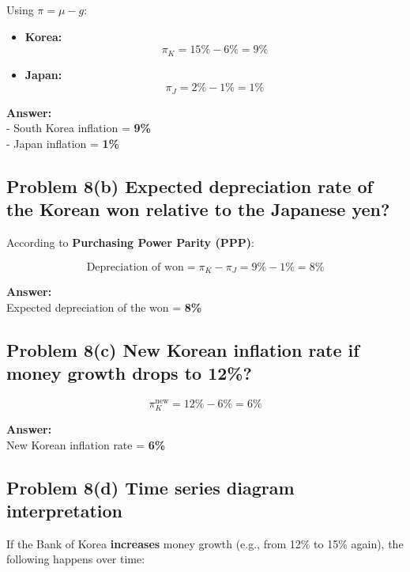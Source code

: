 \documentclass[
]{article}
\begin{document}
Using \(\pi = \mu - g\):

\begin{itemize}
\item
  \textbf{Korea:}\\
  \[
  \pi_K = 15\% - 6\% = 9\%
  \]
\item
  \textbf{Japan:}\\
  \[
  \pi_J = 2\% - 1\% = 1\%
  \]
\end{itemize}

\textbf{Answer:}\\
- South Korea inflation = \textbf{9\%}\\
- Japan inflation = \textbf{1\%}

\subsection{Problem 8(b) Expected depreciation rate of the Korean won
relative to the Japanese
yen?}\label{problem-8b-expected-depreciation-rate-of-the-korean-won-relative-to-the-japanese-yen}

According to \textbf{Purchasing Power Parity (PPP)}:

\[
\text{Depreciation of won} = \pi_K - \pi_J = 9\% - 1\% = 8\%
\]

\textbf{Answer:}\\
Expected depreciation of the won = \textbf{8\%}

\subsection{Problem 8(c) New Korean inflation rate if money growth drops
to
12\%?}\label{problem-8c-new-korean-inflation-rate-if-money-growth-drops-to-12}

\[
\pi_K^{\text{new}} = 12\% - 6\% = 6\%
\]

\textbf{Answer:}\\
New Korean inflation rate = \textbf{6\%}

\subsection{Problem 8(d) Time series diagram
interpretation}\label{problem-8d-time-series-diagram-interpretation}

If the Bank of Korea \textbf{increases} money growth (e.g., from 12\% to
15\% again), the following happens over time:
\end{document}
